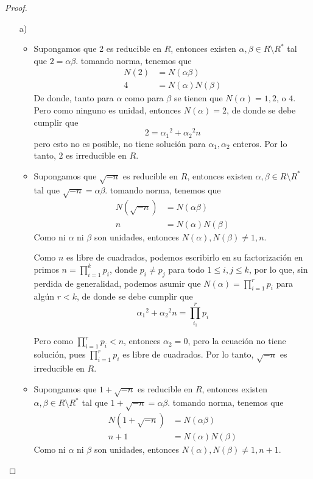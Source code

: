 \begin{problem}[5]
\end{problem}

\begin{proof} \,
    \begin{enumerate}
        \item[a)] \,
        \begin{itemize}
            \item Supongamos que 2 es reducible en $R$, entonces existen $\alpha, \beta \in R \setminus R^*$ tal que $ 2 = \alpha \beta $. tomando norma, tenemos que 
            \begin{align*}
                N(2) &= N(\alpha\beta) \\ 
                4 &= N(\alpha) N(\beta)
            \end{align*}
            De donde, tanto para $\alpha$ como para $\beta$ se tienen que $N(\alpha) = 1, 2$, o $4$. Pero como ninguno es unidad, entonces $N(\alpha) = 2$, de donde se debe cumplir que 
            $$ 2 = {\alpha_1}^2 + {\alpha_2}^2 n $$
            pero esto no es posible, no tiene solución para $\alpha_1, \alpha_2$ enteros. Por lo tanto, $2$ es irreducible en $R$.
            
            \item Supongamos que $\sqrt{-n}$ es reducible en $R$, entonces existen $\alpha, \beta \in R \setminus R^*$ tal que $ \sqrt{-n} = \alpha \beta $. tomando norma, tenemos que
            \begin{align*}
                N(\sqrt{-n}) &= N(\alpha\beta) \\ 
                n &= N(\alpha) N(\beta)
            \end{align*}
            Como ni $\alpha$ ni $\beta$ son unidades, entonces $N(\alpha), N(\beta) \neq 1, n$.

            Como $n$ es libre de cuadrados, podemos escribirlo en su factorización en primos $n = \prod_{i=1}^{k} p_i$, donde $p_i \neq p_j$ para todo $1 \leq i,j \leq k$, por lo que, sin perdida de generalidad, podemos asumir que $N(\alpha) = \prod_{i=1}^{r} p_i$ para algún $r < k$,
            de donde se debe cumplir que
            $$ {\alpha_1}^2 + {\alpha_2}^2 n = \prod_{i_1}^{r} p_i $$

            Pero como $\prod_{i=1}^{r}p_i < n$, entonces $\alpha_2 = 0$, pero la ecuación no tiene solución, pues $\prod_{i=1}^{r}p_i $ es libre de cuadrados. Por lo tanto, $\sqrt{-n}$ es irreducible en $R$.

            \item Supongamos que $1+\sqrt{-n}$ es reducible en $R$, entonces existen $\alpha, \beta \in R \setminus R^*$ tal que $ 1+\sqrt{-n} = \alpha \beta $. tomando norma, tenemos que
            \begin{align*}
                N(1+\sqrt{-n}) &= N(\alpha\beta) \\ 
                n+1 &= N(\alpha) N(\beta)
            \end{align*}
            Como ni $\alpha$ ni $\beta$ son unidades, entonces $N(\alpha), N(\beta) \neq 1, n+1$.


\end{itemize}
\end{enumerate}
\end{proof}
